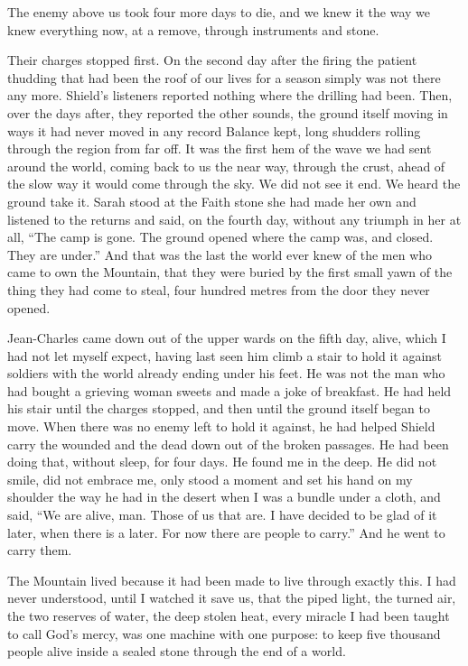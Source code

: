 
The enemy above us took four more days to die, and we knew it the way we knew everything now, at a remove, through instruments and stone.\par

Their charges stopped first. On the second day after the firing the patient thudding that had been the roof of our lives for a season simply was not there any more. Shield's listeners reported nothing where the drilling had been. Then, over the days after, they reported the other sounds, the ground itself moving in ways it had never moved in any record Balance kept, long shudders rolling through the region from far off. It was the first hem of the wave we had sent around the world, coming back to us the near way, through the crust, ahead of the slow way it would come through the sky. We did not see it end. We heard the ground take it. Sarah stood at the Faith stone she had made her own and listened to the returns and said, on the fourth day, without any triumph in her at all, ``The camp is gone. The ground opened where the camp was, and closed. They are under.'' And that was the last the world ever knew of the men who came to own the Mountain, that they were buried by the first small yawn of the thing they had come to steal, four hundred metres from the door they never opened.\par

Jean-Charles came down out of the upper wards on the fifth day, alive, which I had not let myself expect, having last seen him climb a stair to hold it against soldiers with the world already ending under his feet. He was not the man who had bought a grieving woman sweets and made a joke of breakfast. He had held his stair until the charges stopped, and then until the ground itself began to move. When there was no enemy left to hold it against, he had helped Shield carry the wounded and the dead down out of the broken passages. He had been doing that, without sleep, for four days. He found me in the deep. He did not smile, did not embrace me, only stood a moment and set his hand on my shoulder the way he had in the desert when I was a bundle under a cloth, and said, ``We are alive, man. Those of us that are. I have decided to be glad of it later, when there is a later. For now there are people to carry.'' And he went to carry them.\par

The Mountain lived because it had been made to live through exactly this. I had never understood, until I watched it save us, that the piped light, the turned air, the two reserves of water, the deep stolen heat, every miracle I had been taught to call God's mercy, was one machine with one purpose: to keep five thousand people alive inside a sealed stone through the end of a world.\par


